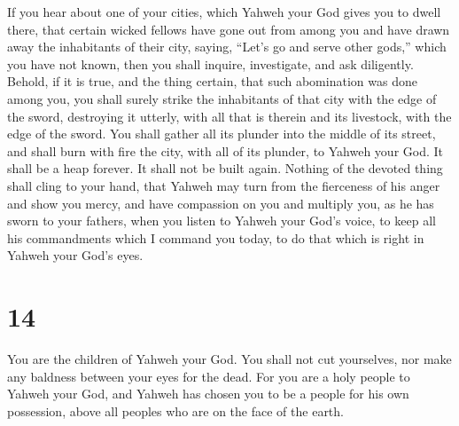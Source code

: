  If you hear about one of your cities, which Yahweh your
God gives you to dwell there, that  certain wicked
fellows have gone out from among you and have drawn away the inhabitants
of their city, saying, ``Let's go and serve other gods,'' which you have
not known,  then you shall inquire, investigate, and ask
diligently. Behold, if it is true, and the thing certain, that such
abomination was done among you,  you shall surely strike
the inhabitants of that city with the edge of the sword, destroying it
utterly, with all that is therein and its livestock, with the edge of
the sword.  You shall gather all its plunder into the
middle of its street, and shall burn with fire the city, with all of its
plunder, to Yahweh your God. It shall be a heap forever. It shall not be
built again.  Nothing of the devoted thing shall cling to
your hand, that Yahweh may turn from the fierceness of his anger and
show you mercy, and have compassion on you and multiply you, as he has
sworn to your fathers,  when you listen to Yahweh your
God's voice, to keep all his commandments which I command you today, to
do that which is right in Yahweh your God's eyes.

\hypertarget{section-13}{%
\section{14}\label{section-13}}

 You are the children of Yahweh your God. You shall not
cut yourselves, nor make any baldness between your eyes for the dead.
 For you are a holy people to Yahweh your God, and Yahweh
has chosen you to be a people for his own possession, above all peoples
who are on the face of the earth.

